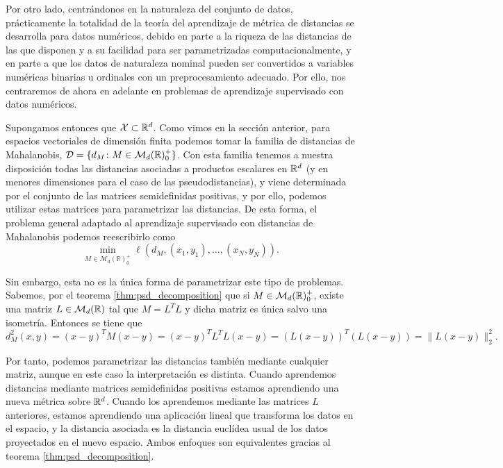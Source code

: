 \documentclass{book}
\begin{document}
	Por otro lado, centrándonos en la naturaleza del conjunto de datos, prácticamente la totalidad de la teoría del aprendizaje de métrica de distancias se desarrolla para datos numéricos, debido en parte a la riqueza de las distancias de las que disponen y a su facilidad para ser parametrizadas computacionalmente, y en parte a que los datos de naturaleza nominal pueden ser convertidos a variables numéricas binarias u ordinales con un preprocesamiento adecuado. Por ello, nos centraremos de ahora en adelante en problemas de aprendizaje supervisado con datos numéricos.

	Supongamos entonces que $\mathcal{X} \subset \mathbb{R}^d$. Como vimos en la sección anterior, para espacios vectoriales de dimensión finita podemos tomar la familia de distancias de Mahalanobis, $\mathcal{D} = \{d_M \colon M \in \mathcal{M}_d(\mathbb{R})^+_0\}$. Con esta familia tenemos a nuestra disposición todas las distancias asociadas a productos escalares en $\mathbb{R}^d$ (y en menores dimensiones para el caso de las pseudodistancias), y viene determinada por el conjunto de las matrices semidefinidas positivas, y por ello, podemos utilizar estas matrices para parametrizar las distancias. De esta forma, el problema general adaptado al aprendizaje supervisado con distancias de Mahalanobis podemos reescribirlo como
	\begin{equation} \label{eq:metric_learning_eq}
		\min_{M \in \mathcal{M}_{d}(\mathbb{R})^+_0} \ell(d_M,(x_1,y_1),\dots,(x_N,y_N)) .
	\end{equation}

	Sin embargo, esta no es la única forma de parametrizar este tipo de problemas. Sabemos, por el teorema \ref{thm:psd_decomposition} que si $M \in \mathcal{M}_d(\mathbb{R})^+_0$, existe una matriz $L \in \mathcal{M}_d(\mathbb{R})$ tal que $M = L^TL$ y dicha matriz es única salvo una isometría. Entonces se tiene que
	\[d_M^2(x,y) = (x-y)^TM(x-y) =(x-y)^TL^TL(x-y) = (L(x-y))^T(L(x-y)) = \|L(x-y)\|_2^2. \]

	Por tanto, podemos parametrizar las distancias también mediante cualquier matriz, aunque en este caso la interpretación es distinta. Cuando aprendemos distancias mediante matrices semidefinidas positivas estamos aprendiendo una nueva métrica sobre $\mathbb{R}^d$. Cuando los aprendemos mediante las matrices $L$ anteriores, estamos aprendiendo una aplicación lineal que transforma los datos en el espacio, y la distancia asociada es la distancia euclídea usual de los datos proyectados en el nuevo espacio. Ambos enfoques son equivalentes gracias al teorema \ref{thm:psd_decomposition}.
\end{document}
